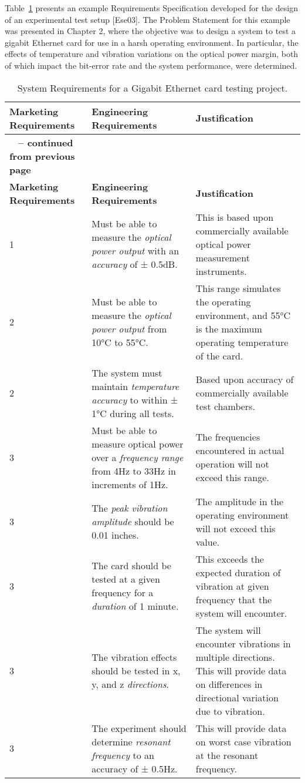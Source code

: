 Table~\ref{table:gigabit} presents an example Requirements Specification developed for
the design of an experimental test setup {[}Ese03{]}. The Problem
Statement for this example was presented in Chapter 2, where the
objective was to design a system to test a gigabit Ethernet card for use
in a harsh operating environment. In particular, the effects of
temperature and vibration variations on the optical power margin, both
of which impact the bit-error rate and the system performance, were
determined.

\begin{longtable}{ |p{2.5cm}|p{5cm}|p{5cm}|} 
\caption{System Requirements for a Gigabit Ethernet card testing project.}
\label{table:gigabit}\\
\hline
\rowcolor{Gray}
\textbf{Marketing Requirements} & \textbf{Engineering Requirements} & \textbf{Justification} \\ \hline
\endfirsthead

\hline
\rowcolor{Gray}
\multicolumn{3}{|c|}
{{\bfseries \tablename\ \thetable{} -- continued from previous page}} \\ \hline
\rowcolor{Gray}
\textbf{Marketing Requirements} & \textbf{Engineering Requirements} & \textbf{Justification} \\ \hline
\endhead
\endfoot

1 & Must be able to measure the \emph{optical power output} with an
\emph{accuracy} of ± 0.5dB. & This is based upon commercially available
optical power measurement instruments. \\ \hline
2 & Must be able to measure the \emph{optical power output} from 10°C to
55°C. & This range simulates the operating environment, and 55°C is the
maximum operating temperature of the card. \\ \hline
2 & The system must maintain \emph{temperature accuracy} to within ± 1°C
during all tests. & Based upon accuracy of commercially available test
chambers. \\ \hline
3 & Must be able to measure optical power over a \emph{frequency range}
from 4Hz to 33Hz in increments of 1Hz. & The frequencies encountered in
actual operation will not exceed this range. \\ \hline
3 & The \emph{peak vibration amplitude} should be 0.01 inches. & The
amplitude in the operating environment will not exceed this value. \\ \hline
3 & The card should be tested at a given frequency for a \emph{duration}
of 1 minute. & This exceeds the expected duration of vibration at given
frequency that the system will encounter. \\ \hline
3 & The vibration effects should be tested in x, y, and z
\emph{directions}. & The system will encounter vibrations in multiple
directions. This will provide data on differences in directional
variation due to vibration. \\ \hline
3 & The experiment should determine \emph{resonant frequency} to an
accuracy of ± 0.5Hz. & This will provide data on worst case vibration at
the resonant frequency. \\ \hline


\end{longtable}
